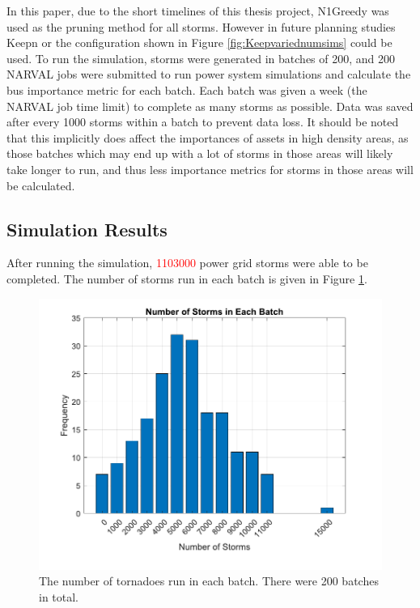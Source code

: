 \documentclass[12pt]{article}
\begin{document}
In this paper, due to the short timelines of this thesis project, N1Greedy was used as the pruning method for all storms. However in future planning studies Keepn or the configuration shown in Figure \ref{fig:Keepvariednumsims} could be used. To run the simulation, storms were generated in batches of 200, and 200 NARVAL jobs were submitted to run power system simulations and calculate the bus importance metric for each batch. Each batch was given a week (the NARVAL job time limit) to complete as many storms as possible. Data was saved after every 1000 storms within a batch to prevent data loss. It should be noted that this implicitly does affect the importances of assets in high density areas, as those batches which may end up with a lot of storms in those areas will likely take longer to run, and thus less importance metrics for storms in those areas will be calculated.

\subsection{Simulation Results}
After running the simulation, \textcolor{red}{1103000} power grid storms were able to be completed. The number of storms run in each batch is given in Figure \ref{fig:numsimsperbatch}. 

\begin{figure}[ht]
    \centering %
    \includegraphics[scale = 0.6]{numsimsperbatch.pdf}
    \caption[Number of tornadoes run in each batch]{The number of tornadoes run in each batch. There were 200 batches in total.}
    \label{fig:numsimsperbatch}
\end{figure}
\end{document}
